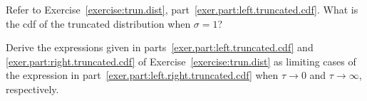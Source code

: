 \begin{exercise}
Refer to Exercise~\ref{exercise:trun.dist},
part~\ref{exer.part:left.truncated.cdf}.  What is the cdf of the
truncated distribution when $\sigma=1$?
\end{exercise}

\begin{exercise1}
Derive the expressions given in
parts~\ref{exer.part:left.truncated.cdf} and
\ref{exer.part:right.truncated.cdf} of
Exercise~\ref{exercise:trun.dist} as limiting cases of the
expression in part~\ref{exer.part:left.right.truncated.cdf} when
$\tau \to 0$ and $\tau \to \infty$, respectively.
\end{exercise1}

